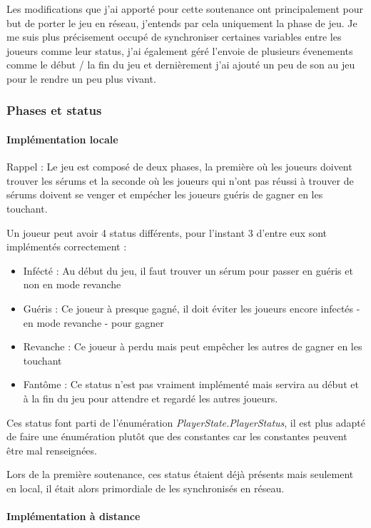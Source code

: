\documentclass{article}
\begin{document}
Les modifications que j'ai apporté pour cette soutenance ont principalement pour but de porter le jeu en réseau, j'entends par cela uniquement la phase de jeu. Je me suis plus précisement occupé de synchroniser certaines variables entre les joueurs comme leur status, j'ai également géré l'envoie de plusieurs évenements comme le début / la fin du jeu et dernièrement j'ai ajouté un peu de son au jeu pour le rendre un peu plus vivant.

\subsubsection{Phases et status}

\paragraph{Implémentation locale}

Rappel : Le jeu est composé de deux phases, la première où les joueurs doivent trouver les sérums et la seconde où les joueurs qui n'ont pas réussi à trouver de sérums doivent se venger et empécher les joueurs guéris de gagner en les touchant.

Un joueur peut avoir 4 status différents, pour l'instant 3 d'entre eux sont implémentés correctement :

\begin{itemize}
\item Infécté : Au début du jeu, il faut trouver un sérum pour passer en guéris et non en mode revanche
\item Guéris : Ce joueur à presque gagné, il doit éviter les joueurs encore infectés - en mode revanche - pour gagner
\item Revanche : Ce joueur à perdu mais peut empêcher les autres de gagner en les touchant
\item Fantôme : Ce status n'est pas vraiment implémenté mais servira au début et à la fin du jeu pour attendre et regardé les autres joueurs.
\end{itemize}

Ces status font parti de l'énumération \emph{PlayerState.PlayerStatus}, il est plus adapté de faire une énumération plutôt que des constantes car les constantes peuvent être mal renseignées.

Lors de la première soutenance, ces status étaient déjà présents mais seulement en local, il était alors primordiale de les synchronisés en réseau.

\paragraph{Implémentation à distance}
\end{document}
